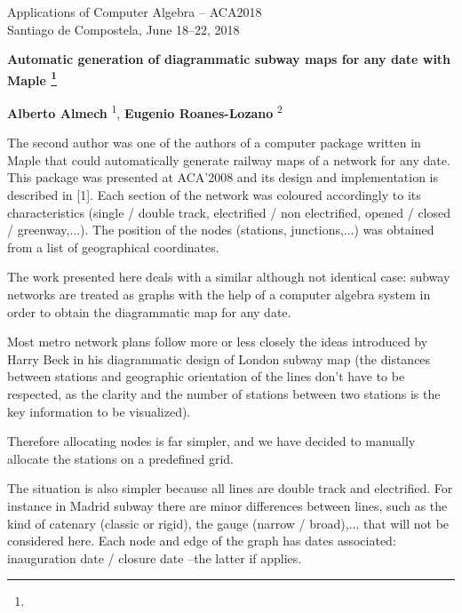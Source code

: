 \documentclass{article}
\makeatletter
\newcommand{\TITLE}[2][]{
  \begin{center} \Large \bfseries #2%
  \def\@temp{#1}\ifx\@temp\@empty\relax\else\footnote{#1}\fi\end{center}}
\newcommand{\AUTHOR}[2][]{\textbf{#2}%
  \def\@temp{#1}\ifx\@temp\@empty\relax\else\textsuperscript{#1}\fi}
\newcommand{\HEADING}{
{\noindent \small Applications of Computer Algebra -- ACA2018 \\
Santiago de Compostela, June 18--22, 2018} \vspace{10pt}}
\makeatother
\begin{document}
 

\HEADING


\TITLE{Automatic generation of diagrammatic subway maps for any date
       with Maple}



\begin{center}
 \AUTHOR[1]{Alberto Almech},
 \AUTHOR[2]{Eugenio Roanes-Lozano}
\end{center}



The second author was one of the authors of 
a computer package written in Maple that could automatically 
generate railway maps of a network for any date. This package was
presented at ACA'2008 and its design and implementation is described in [1]. 
Each section of the network was coloured accordingly to its characteristics
(single / double track, electrified / non electrified,
opened / closed / greenway,...). 
The position of the nodes (stations, junctions,...) was obtained from 
a list of geographical coordinates.

The work presented here deals with a similar although not identical 
case: subway networks are treated as graphs with the help of a computer
algebra system in order to obtain the diagrammatic map for any date. 

Most metro network plans follow
more or less closely the ideas introduced by Harry Beck in his  
diagrammatic design of London subway map (the distances between stations
and geographic orientation of the lines don't have to be respected, as
the clarity and the number of stations between two stations is
the key information to be visualized). 

Therefore allocating nodes is far simpler, and we have decided to 
manually allocate the stations on a predefined grid.

The situation is also simpler because all lines
are double track and electrified. For instance in Madrid subway 
there are minor differences between lines, such as the kind of catenary 
(classic or rigid), the gauge (narrow / broad),... that will not be 
considered here. Each node and edge of the graph has dates 
associated: inauguration date / closure date --the latter if applies.
\end{document}
